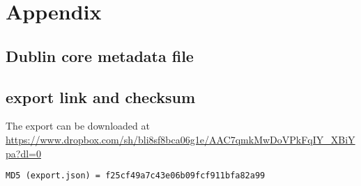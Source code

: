 \appendix
\section{Appendix}\label{sec:appendix}
\subsection{Dublin core metadata file}\label{sec:dc}

\subsection{export link and checksum}
The export can be downloaded at \url{https://www.dropbox.com/sh/bli8sf8bca06g1e/AAC7qmkMwDoVPkFqIY_XBiYpa?dl=0}
\begin{lstlisting}
MD5 (export.json) = f25cf49a7c43e06b09fcf911bfa82a99
\end{lstlisting}



